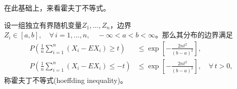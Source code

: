在此基础上，来看霍夫丁不等式。
\begin{theorem}[霍夫丁不等式]
  \label{theorem:hoeffding-inequality}
  设一组独立有界随机变量$Z_{1},\ldots,Z_{n}$，边界$Z_{i} \in \left[ a, b\right], \quad \forall \, i =1,\ldots,n, \quad - \infty < a < b < \infty$。那么其分布的边界满足
  \begin{align}
    \label{eq:hoeffding-inequality-upper}
    P \left(
    \frac{1}{n} \sum_{i=1}^{n}
    \left( X_{i} - E X_{i} \right)
    \ge t
    \right)
    & \le \exp \left[
    - \frac{
    2 n t^{2}
    }{
    \left( b - a \right)^{2}
    }
    \right], \\
    \label{eq:hoeffding-inequality-lower}
    P \left(
    \frac{1}{n} \sum_{i=1}^{n}
    \left( X_{i} - E X_{i} \right)
    \le -t
    \right)
    & \le \exp \left[
    - \frac{
    2 n t^{2}
    }{
    \left( b - a \right)^{2}
    }
    \right], \quad \forall \, t > 0,
  \end{align}
称霍夫丁不等式(hoeffding inequality)。
\end{theorem}
